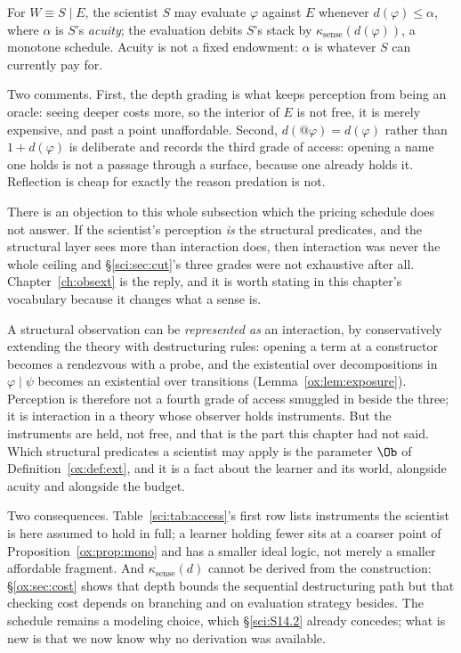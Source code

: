 \begin{definition}
\label{sci:def:sense}
For $W \equiv S \mid E$, the scientist $S$ may evaluate $\varphi$ against $E$ whenever
$d(\varphi) \le \alpha$, where $\alpha$ is $S$'s \emph{acuity}; the evaluation debits $S$'s stack by
$\kappa_{\mathrm{sense}}(d(\varphi))$, a monotone schedule. Acuity is not a fixed endowment: $\alpha$
is whatever $S$ can currently pay for.
\end{definition}

Two comments. First, the depth grading is what keeps perception from being an oracle: seeing deeper
costs more, so the interior of $E$ is not free, it is merely expensive, and past a point unaffordable.
Second, $d(@\varphi) = d(\varphi)$ rather than $1 + d(\varphi)$ is deliberate and records the third
grade of access: opening a name one holds is not a passage through a surface, because one already
holds it. Reflection is cheap for exactly the reason predation is not.

\begin{remark}
\label{sci:rem:senses-instruments}
There is an objection to this whole subsection which the pricing schedule does not answer. If the
scientist's perception \emph{is} the structural predicates, and the structural layer sees more than
interaction does, then interaction was never the whole ceiling and \S\ref{sci:sec:cut}'s three grades
were not exhaustive after all. Chapter~\ref{ch:obsext} is the reply, and it is worth stating in this
chapter's vocabulary because it changes what a sense is.

A structural observation can be \emph{represented as} an interaction, by conservatively extending the
theory with destructuring rules: opening a term at a constructor becomes a rendezvous with a probe,
and the existential over decompositions in $\varphi \mid \psi$ becomes an existential over
transitions (Lemma~\ref{ox:lem:exposure}). Perception is therefore not a fourth grade of access
smuggled in beside the three; it is interaction in a theory whose observer holds instruments. But the
instruments are held, not free, and that is the part this chapter had not said. Which structural
predicates a scientist may apply is the parameter $\Ob$ of Definition~\ref{ox:def:ext}, and it is a
fact about the learner and its world, alongside acuity and alongside the budget.

Two consequences. Table~\ref{sci:tab:access}'s first row lists instruments the scientist is here
assumed to hold in full; a learner holding fewer sits at a coarser point of
Proposition~\ref{ox:prop:mono} and has a smaller ideal logic, not merely a smaller affordable
fragment. And $\kappa_{\mathrm{sense}}(d)$ cannot be derived from the construction:
\S\ref{ox:sec:cost} shows that depth bounds the sequential destructuring path but that checking cost
depends on branching and on evaluation strategy besides. The schedule remains a modeling choice,
which \S\ref{sci:S14.2} already concedes; what is new is that we now know why no derivation was
available.
\end{remark}

